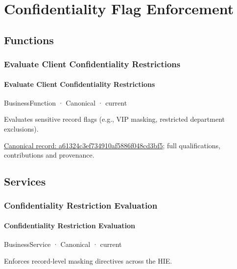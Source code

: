 \section{Confidentiality Flag Enforcement}

\subsection{Functions}

\subsubsection{Evaluate Client Confidentiality Restrictions}

\paragraph{Evaluate Client Confidentiality Restrictions}

\label{element:a61324c3ef734910af5886f048cd3bf5}
{\small BusinessFunction · Canonical · current}\par

Evaluates sensitive record flags (e.g., VIP masking, restricted department exclusions).


{\footnotesize \href{../../../../continuum/business/business-function/a61324c3ef734910af5886f048cd3bf5.md}{Canonical record: a61324c3ef734910af5886f048cd3bf5}; full qualifications, contributions and provenance.}\par
\subsection{Services}

\subsubsection{Confidentiality Restriction Evaluation}

\paragraph{Confidentiality Restriction Evaluation}

\label{element:87cfcfb20b7a4570b502b4a9a53803ad}
{\small BusinessService · Canonical · current}\par

Enforces record-level masking directives across the HIE.


